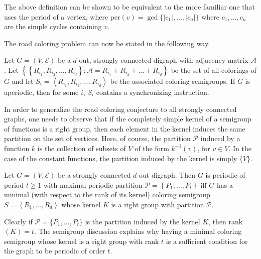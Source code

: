The above definition can be shown to be equivalent to the more familiar one that uses the period of a vertex, where 
per$(v) = \gcd\{|c_1|,\ldots,|c_n|\}$ where $c_1,\ldots,c_n$ are the simple cycles containing $v$.

	The road coloring problem can now be stated in the following way.

	Let $G=(V,\mathcal E)$ be a $d$-out, strongly connected digraph 
with adjacency matrix $\mathcal A$. Let $\left\{\left\{R_{i_1},R_{i_2},\dots,R_{i_d}\right\}:
\mathcal A=R_{i_1}+R_{i_2}+ \ldots +R_{i_d}\right\}$ be the set of all colorings of 
$G$ and let $S_i=\left\langle R_{i_1},R_{i_2},\dots,R_{i_d}\right\rangle$ 
be the  associated coloring semigroups. If $G$ is aperiodic, then for some 
$i$, $S_i$ contains a synchronizing instruction.


	In order to generalize the road coloring conjecture to all strongly 
connected graphs, one needs to observe that if the completely simple kernel 
of a semigroup of functions is a right group, then each element in the kernel 
induces the same partition on the set of vertices.  Here, of course, the partition 
$\mathcal P$ induced by a function $k$ is the collection of subsets of $V$ of the form 
$k^{-1}(v)$, for $v \in V$.  In the case of the constant functions, the partition 
induced by the kernel is simply $\{V\}$.

	Let $G=(V,\mathcal E)$ be a strongly connected $d$-out digraph. Then $G$ is
periodic of period $t\ge 1$ with maximal periodic partition 
$\mathcal P=\left\{P_1,\dots,P_t\right\}$ iff $G$ has a minimal 
{\rm(}with respect to the rank of its kernel{\rm )}
coloring semigroup $S=\left\langle R_1,\dots,R_d\right\rangle$ whose kernel
$K$ is a right group with partition $\mathcal P$.


	Clearly if $\mathcal P = \{P_1,\ldots,P_t\}$ is the partition induced by the kernel $K$, then rank$(K)=t$. The semigroup discussion explains why having a minimal coloring 
semigroup whose kernel is a right group with rank $t$ is a sufficient condition for the graph to be periodic of order $t$. 


